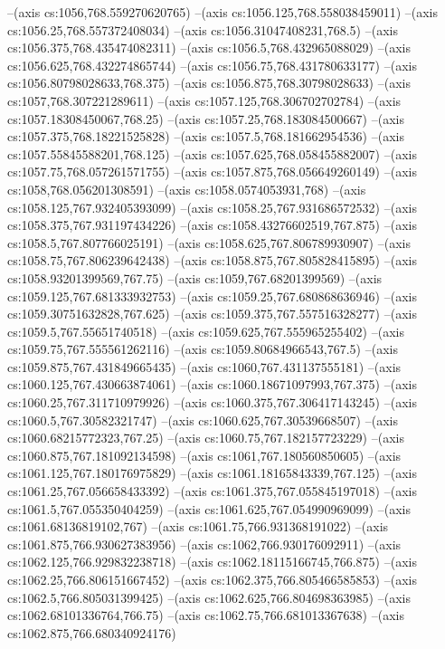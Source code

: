 --(axis cs:1056,768.559270620765)
--(axis cs:1056.125,768.558038459011)
--(axis cs:1056.25,768.557372408034)
--(axis cs:1056.31047408231,768.5)
--(axis cs:1056.375,768.435474082311)
--(axis cs:1056.5,768.432965088029)
--(axis cs:1056.625,768.432274865744)
--(axis cs:1056.75,768.431780633177)
--(axis cs:1056.80798028633,768.375)
--(axis cs:1056.875,768.30798028633)
--(axis cs:1057,768.307221289611)
--(axis cs:1057.125,768.306702702784)
--(axis cs:1057.18308450067,768.25)
--(axis cs:1057.25,768.183084500667)
--(axis cs:1057.375,768.18221525828)
--(axis cs:1057.5,768.181662954536)
--(axis cs:1057.55845588201,768.125)
--(axis cs:1057.625,768.058455882007)
--(axis cs:1057.75,768.057261571755)
--(axis cs:1057.875,768.056649260149)
--(axis cs:1058,768.056201308591)
--(axis cs:1058.0574053931,768)
--(axis cs:1058.125,767.932405393099)
--(axis cs:1058.25,767.931686572532)
--(axis cs:1058.375,767.931197434226)
--(axis cs:1058.43276602519,767.875)
--(axis cs:1058.5,767.807766025191)
--(axis cs:1058.625,767.806789930907)
--(axis cs:1058.75,767.806239642438)
--(axis cs:1058.875,767.805828415895)
--(axis cs:1058.93201399569,767.75)
--(axis cs:1059,767.68201399569)
--(axis cs:1059.125,767.681333932753)
--(axis cs:1059.25,767.680868636946)
--(axis cs:1059.30751632828,767.625)
--(axis cs:1059.375,767.557516328277)
--(axis cs:1059.5,767.55651740518)
--(axis cs:1059.625,767.555965255402)
--(axis cs:1059.75,767.555561262116)
--(axis cs:1059.80684966543,767.5)
--(axis cs:1059.875,767.431849665435)
--(axis cs:1060,767.431137555181)
--(axis cs:1060.125,767.430663874061)
--(axis cs:1060.18671097993,767.375)
--(axis cs:1060.25,767.311710979926)
--(axis cs:1060.375,767.306417143245)
--(axis cs:1060.5,767.30582321747)
--(axis cs:1060.625,767.30539668507)
--(axis cs:1060.68215772323,767.25)
--(axis cs:1060.75,767.182157723229)
--(axis cs:1060.875,767.181092134598)
--(axis cs:1061,767.180560850605)
--(axis cs:1061.125,767.180176975829)
--(axis cs:1061.18165843339,767.125)
--(axis cs:1061.25,767.056658433392)
--(axis cs:1061.375,767.055845197018)
--(axis cs:1061.5,767.055350404259)
--(axis cs:1061.625,767.054990969099)
--(axis cs:1061.68136819102,767)
--(axis cs:1061.75,766.931368191022)
--(axis cs:1061.875,766.930627383956)
--(axis cs:1062,766.930176092911)
--(axis cs:1062.125,766.929832238718)
--(axis cs:1062.18115166745,766.875)
--(axis cs:1062.25,766.806151667452)
--(axis cs:1062.375,766.805466585853)
--(axis cs:1062.5,766.805031399425)
--(axis cs:1062.625,766.804698363985)
--(axis cs:1062.68101336764,766.75)
--(axis cs:1062.75,766.681013367638)
--(axis cs:1062.875,766.680340924176)
